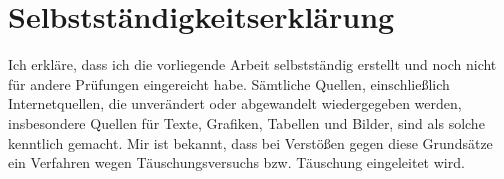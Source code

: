 \section*{Selbstständigkeitserklärung}

Ich erkläre, dass ich die vorliegende Arbeit selbstständig erstellt und noch nicht für
andere Prüfungen eingereicht habe. Sämtliche Quellen, einschließlich
Internetquellen, die unverändert oder abgewandelt wiedergegeben werden,
insbesondere Quellen für Texte, Grafiken, Tabellen und Bilder, sind als solche
kenntlich gemacht. Mir ist bekannt, dass bei Verstößen gegen diese Grundsätze
ein Verfahren wegen Täuschungsversuchs bzw. Täuschung eingeleitet wird.

